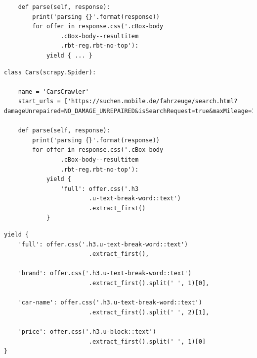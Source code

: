 \documentclass{beamer}
\begin{document}
\begin{frame}
\begin{lstlisting}
    def parse(self, response):
        print('parsing {}'.format(response))
        for offer in response.css('.cBox-body
        		.cBox-body--resultitem
        		.rbt-reg.rbt-no-top'):
        	yield { ... }
        	\end{lstlisting}
			
	\framebreak
	
	
			\begin{lstlisting}
class Cars(scrapy.Spider):
    
    name = 'CarsCrawler'
    start_urls = ['https://suchen.mobile.de/fahrzeuge/search.html?damageUnrepaired=NO_DAMAGE_UNREPAIRED&isSearchRequest=true&maxMileage=100&maxPowerAsArray=PS&minPowerAsArray=35&minPowerAsArray=PS&minPrice=5000&scopeId=C&usage=NEW&usageType=PRE_REGISTRATION']
    
    def parse(self, response):
        print('parsing {}'.format(response))
        for offer in response.css('.cBox-body
        		.cBox-body--resultitem
        		.rbt-reg.rbt-no-top'):
            yield {
                'full': offer.css('.h3
                        .u-text-break-word::text')
                        .extract_first()
            }
        	\end{lstlisting}
			
	\framebreak
	
	
			\begin{lstlisting}
yield {
    'full': offer.css('.h3.u-text-break-word::text')
                        .extract_first(),
                        
    'brand': offer.css('.h3.u-text-break-word::text')
                        .extract_first().split(' ', 1)[0],

    'car-name': offer.css('.h3.u-text-break-word::text')
                        .extract_first().split(' ', 2)[1],

    'price': offer.css('.h3.u-block::text')
                        .extract_first().split(' ', 1)[0]
}
        	\end{lstlisting}
			
	\framebreak
	
\end{frame}
	
\end{document}
